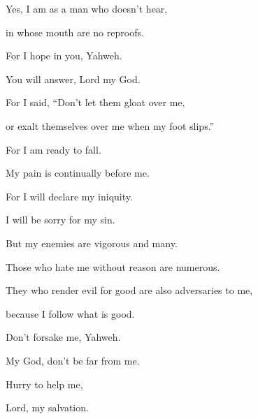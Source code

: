 {\par }{\Q {}Yes, I am as a man who doesn’t hear,
\par }{\QB in whose mouth are no reproofs.
\par }{\Q {}For I hope in you, Yahweh.
\par }{\QB You will answer, Lord my God.
\par }{\Q {}For I said, “Don’t let them gloat over me,
\par }{\QB or exalt themselves over me when my foot slips.”
\par }{\Q {}For I am ready to fall.
\par }{\QB My pain is continually before me.
\par }{\Q {}For I will declare my iniquity.
\par }{\QB I will be sorry for my sin.
\par }{\Q {}But my enemies are vigorous and many.
\par }{\QB Those who hate me without reason are numerous.
\par }{\Q {}They who render evil for good are also adversaries to me,
\par }{\QB because I follow what is good.
\par }{\Q {}Don’t forsake me, Yahweh.
\par }{\QB My God, don’t be far from me.
\par }{\Q {}Hurry to help me,
\par }{\QB Lord, my salvation.

\par }
